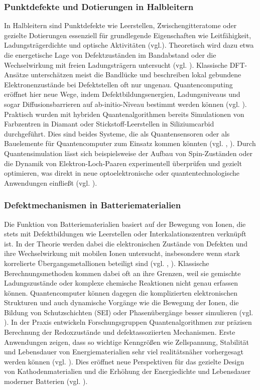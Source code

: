\subsubsection{Punktdefekte und Dotierungen in Halbleitern}

In Halbleitern sind Punktdefekte wie Leerstellen, Zwischengitteratome oder gezielte Dotierungen essenziell für grundlegende Eigenschaften wie Leitfähigkeit, Ladungsträgerdichte und optische Aktivitäten (vgl.\cite{bassett_quantum_2019}). Theoretisch wird dazu etwa die energetische Lage von Defektzuständen im Bandabstand oder die Wechselwirkung mit freien Ladungsträgern untersucht (vgl. \cite{freysoldt_first-principles_2014}). Klassische DFT-Ansätze unterschätzen meist die Bandlücke und beschreiben lokal gebundene Elektronenzustände bei Defektstellen oft nur ungenau. Quantencomputing eröffnet hier neue Wege, indem Defektbildungsenergien, Ladungsniveaus und sogar Diffusionsbarrieren auf ab-initio-Niveau bestimmt werden können (vgl. \cite{bassett_quantum_2019}).
Praktisch wurden mit hybriden Quantenalgorithmen bereits Simulationen von Farbzentren in Diamant oder Stickstoff-Leerstellen in Siliziumcarbid durchgeführt. Dies sind beides Systeme, die als Quantensensoren oder als Bauelemente für Quantencomputer zum Einsatz kommen könnten  (vgl. \cite{baker_simulating_2024}, \cite{cao_ab_2023}). Durch Quantensimulation lässt sich beispielsweise der Aufbau von Spin-Zuständen oder die Dynamik von Elektron-Loch-Paaren experimentell überprüfen und gezielt optimieren, was direkt in neue optoelektronische oder quantentechnologische Anwendungen einfließt (vgl. \cite{cao_ab_2023}).

\subsubsection{Defektmechanismen in Batteriematerialien}

Die Funktion von Batteriematerialien basiert auf der Bewegung von Ionen, die stets mit Defektbildungen wie Leerstellen oder Interkalationszentren verknüpft ist. In der Theorie werden dabei die elektronischen Zustände von Defekten und ihre Wechselwirkung mit mobilen Ionen untersucht, insbesondere wenn stark korrelierte Übergangsmetallionen beteiligt sind (vgl. \cite{hanaor_computational_2024}, \cite{freysoldt_first-principles_2014}). Klassische Berechnungsmethoden kommen dabei oft an ihre Grenzen, weil sie gemischte Ladungszustände oder komplexe chemische Reaktionen nicht genau erfassen können. Quantencomputer können dagegen die komplizierten elektronischen Strukturen und auch dynamische Vorgänge wie die Bewegung der Ionen, die Bildung von Schutzschichten (SEI) oder Phasenübergänge besser simulieren (vgl. \cite{urban_computational_2016}).
In der Praxis entwickeln Forschungsgruppen Quantenalgorithmen zur präzisen Berechnung der Redoxzustände und defektassoziierten Mechanismen. Erste Anwendungen zeigen, dass so wichtige Kenngrößen wie Zellspannung, Stabilität und Lebensdauer von Energiematerialien sehr viel realitätsnäher vorhergesagt werden können (vgl. \cite{baker_simulating_2024}). Dies eröffnet neue Perspektiven für das gezielte Design von Kathodenmaterialien und die Erhöhung der Energiedichte und Lebensdauer moderner Batterien (vgl. \cite{hanaor_computational_2024}).

